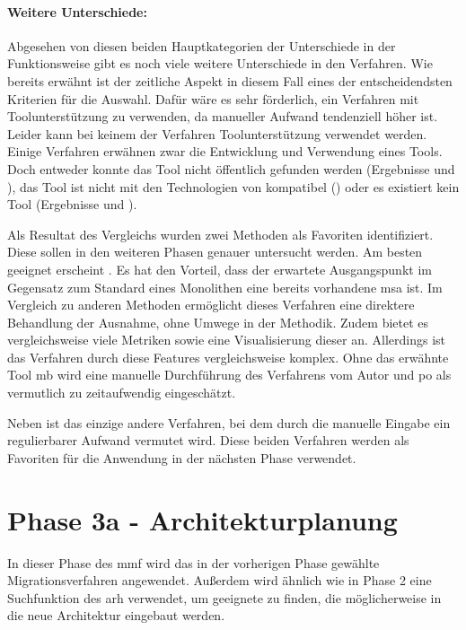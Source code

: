 \paragraph{Weitere Unterschiede:} Abgesehen von diesen beiden Hauptkategorien der Unterschiede in der Funktionsweise gibt es noch viele weitere Unterschiede in den Verfahren.
Wie bereits erwähnt ist der zeitliche Aspekt in diesem Fall eines der entscheidendsten Kriterien für die Auswahl.
Dafür wäre es sehr förderlich, ein Verfahren mit Toolunterstützung zu verwenden, da manueller Aufwand tendenziell höher ist.
Leider kann bei keinem der Verfahren Toolunterstützung verwendet werden.
Einige Verfahren erwähnen zwar die Entwicklung und Verwendung eines Tools.
Doch entweder konnte das Tool nicht öffentlich gefunden werden (Ergebnisse  und ), das Tool ist nicht mit den Technologien von \jf kompatibel () oder es existiert kein Tool (Ergebnisse  und ).

Als Resultat des Vergleichs wurden zwei Methoden als Favoriten identifiziert.
Diese sollen in den weiteren Phasen genauer untersucht werden.
Am besten geeignet erscheint .
Es hat den Vorteil, dass der erwartete Aus\-gangs\-punkt im Gegensatz zum Standard eines Monolithen eine bereits vorhandene \gls{msa} ist.
Im Vergleich zu anderen Methoden ermöglicht dieses Verfahren eine direktere Behandlung der Ausnahme, ohne Umwege in der Methodik.
Zudem bietet es vergleichsweise viele Metriken sowie eine Visualisierung dieser an.
Allerdings ist das Verfahren durch diese Features vergleichsweise komplex.
Ohne das erwähnte Tool \gls{mb} wird eine manuelle Durchführung des Verfahrens vom Autor und \gls{po} als vermutlich zu zeitaufwendig eingeschätzt.

Neben  ist  das einzige andere Verfahren, bei dem durch die manuelle Eingabe ein regulierbarer Aufwand vermutet wird.
Diese beiden Verfahren werden als Favoriten für die Anwendung in der nächsten Phase verwendet.

\section{Phase 3a - Architekturplanung}
\label{sec:durchführung-phase3}

In dieser Phase des \acrfull{mmf} wird das in der vorherigen Phase gewählte Migrationsverfahren angewendet.
Außerdem wird ähnlich wie in Phase 2 eine Suchfunktion des \gls{arh} verwendet, um geeignete \bpp zu finden, die möglicherweise in die neue Architektur eingebaut werden.


